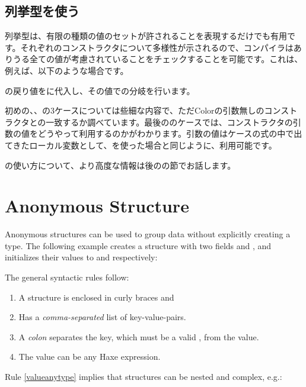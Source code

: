 \subsection{列挙型を使う}
\label{types-enum-using}

列挙型は、有限の種類の値のセットが許されることを表現するだけでも有用です。それぞれのコンストラクタについて多様性が示されるので、コンパイラはありうる全ての値が考慮されていることをチェックすることを可能です。これは、例えば、以下のような場合です。


の戻り値をに代入し、その値での分岐を行います。

初めの、、の3ケースについては些細な内容で、ただColorの引数無しのコンストラクタとの一致するか調べています。最後ののケースでは、コンストラクタの引数の値をどうやって利用するのかがわかります。引数の値はケースの式の中で出てきたローカル変数として、を使った場合と同じように、利用可能です。

の使い方について、より高度な情報は後のの節でお話します。


\section{Anonymous Structure}
\label{types-anonymous-structure}

Anonymous structures can be used to group data without explicitly creating a type. The following example creates a structure with two fields  and , and initializes their values to  and  respectively:

The general syntactic rules follow:

\begin{enumerate}
	\item A structure is enclosed in curly braces \expr{$\left\{\right\}$} and
	\item Has a \emph{comma-separated} list of key-value-pairs.
	\item A \emph{colon} separates the key, which must be a valid , from the value.
	\item\label{valueanytype} The value can be any Haxe expression.
\end{enumerate}
Rule \ref{valueanytype} implies that structures can be nested and complex, e.g.:

